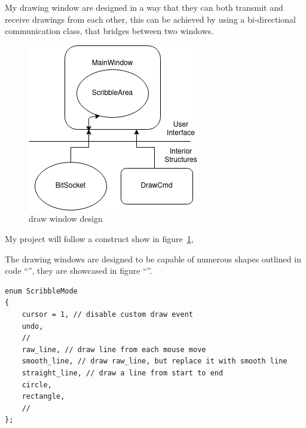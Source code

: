 \documentclass[11pt]{article}
\begin{document}
\begin{multicols*}{2}

My drawing window are designed in a way that they can both transmit and receive drawings from each other, this can be achieved by using a bi-directional communication class, that bridges between two windows.

\begin{figure}[H]
  \centering
  \includegraphics[width=0.75\columnwidth]{draw-win-design}
  \caption{draw window design}
  \label{fig:draw-win-design}
\end{figure}
\figsquish

My project will follow a construct show in figure~\ref{fig:draw-win-design}, %


The drawing windows are designed to be capable of numerous shapes outlined in code ``'', they are showcased in figure ``''.

\begin{lstlisting}[label=lst:scribble-mode-enum, caption={ScribbleMode enum}]
enum ScribbleMode
{
    cursor = 1, // disable custom draw event
    undo,
    //
    raw_line, // draw line from each mouse move
    smooth_line, // draw raw_line, but replace it with smooth line
    straight_line, // draw a line from start to end
    circle,
    rectangle,
    //
};
\end{lstlisting}


\end{multicols*}
\end{document}
